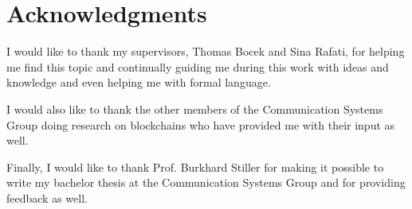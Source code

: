 \chapter*{Acknowledgments}

I would like to thank my supervisors, Thomas Bocek and Sina Rafati, for helping me find this topic and continually guiding me during this work with ideas and knowledge and even helping me with formal language.

I would also like to thank the other members of the Communication Systems Group doing research on blockchains who have provided me with their input as well.

Finally, I would like to thank Prof. Burkhard Stiller for making it possible to write my bachelor thesis at the Communication Systems Group and for providing feedback as well.
